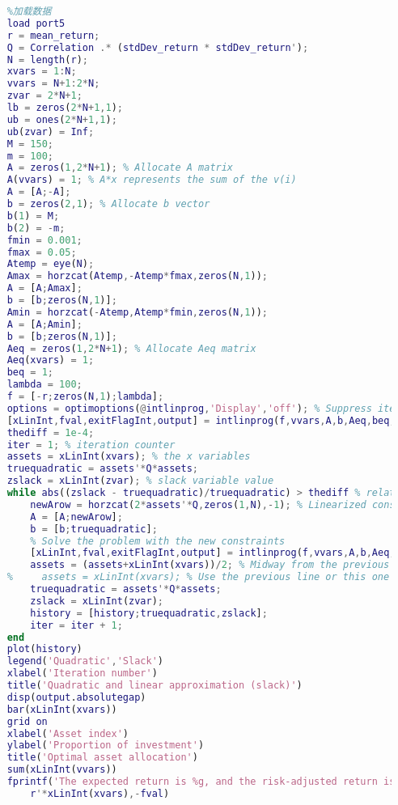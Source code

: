     \begin{lstlisting}[language = Matlab]
    %% 混合整数规划求解组合投资问题
    %加载数据
    load port5
    r = mean_return;
    Q = Correlation .* (stdDev_return * stdDev_return');
    N = length(r);
    xvars = 1:N;
    vvars = N+1:2*N;
    zvar = 2*N+1;
    lb = zeros(2*N+1,1);
    ub = ones(2*N+1,1);
    ub(zvar) = Inf;
    M = 150;
    m = 100;
    A = zeros(1,2*N+1); % Allocate A matrix
    A(vvars) = 1; % A*x represents the sum of the v(i)
    A = [A;-A];
    b = zeros(2,1); % Allocate b vector
    b(1) = M;
    b(2) = -m;
    fmin = 0.001;
    fmax = 0.05;
    Atemp = eye(N);
    Amax = horzcat(Atemp,-Atemp*fmax,zeros(N,1));
    A = [A;Amax];
    b = [b;zeros(N,1)];
    Amin = horzcat(-Atemp,Atemp*fmin,zeros(N,1));
    A = [A;Amin];
    b = [b;zeros(N,1)];
    Aeq = zeros(1,2*N+1); % Allocate Aeq matrix
    Aeq(xvars) = 1;
    beq = 1;
    lambda = 100;
    f = [-r;zeros(N,1);lambda];
    options = optimoptions(@intlinprog,'Display','off'); % Suppress iterative display
    [xLinInt,fval,exitFlagInt,output] = intlinprog(f,vvars,A,b,Aeq,beq,lb,ub,options);
    thediff = 1e-4;
    iter = 1; % iteration counter
    assets = xLinInt(xvars); % the x variables
    truequadratic = assets'*Q*assets;
    zslack = xLinInt(zvar); % slack variable value
    while abs((zslack - truequadratic)/truequadratic) > thediff % relative error
        newArow = horzcat(2*assets'*Q,zeros(1,N),-1); % Linearized constraint
        A = [A;newArow];
        b = [b;truequadratic];
        % Solve the problem with the new constraints
        [xLinInt,fval,exitFlagInt,output] = intlinprog(f,vvars,A,b,Aeq,beq,lb,ub,options);
        assets = (assets+xLinInt(xvars))/2; % Midway from the previous to the current
    %     assets = xLinInt(xvars); % Use the previous line or this one
        truequadratic = assets'*Q*assets;
        zslack = xLinInt(zvar);
        history = [history;truequadratic,zslack];
        iter = iter + 1;
    end
    plot(history)
    legend('Quadratic','Slack')
    xlabel('Iteration number')
    title('Quadratic and linear approximation (slack)')
    disp(output.absolutegap)
    bar(xLinInt(xvars))
    grid on
    xlabel('Asset index')
    ylabel('Proportion of investment')
    title('Optimal asset allocation')
    sum(xLinInt(vvars))
    fprintf('The expected return is %g, and the risk-adjusted return is %g.\n',...
        r'*xLinInt(xvars),-fval)
    \end{lstlisting}

